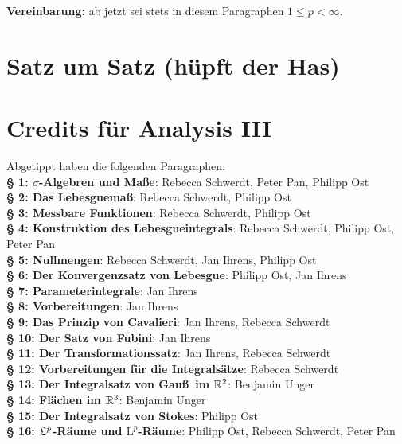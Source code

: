 \documentclass[a4paper,twoside,DIV15,BCOR12mm,chapterprefix=true,headings=onelinechapter]{scrbook}
\begin{document}
\textbf{Vereinbarung:} ab jetzt sei stets in diesem Paragraphen $1 \leq p < \infty$.


\appendix
\chapter{Satz um Satz (hüpft der Has)}

\renewcommand{\indexname}{Stichwortverzeichnis}
\printindex

\chapter{Credits für Analysis III} Abgetippt haben die folgenden Paragraphen:\\%
\textbf{§ 1: $\sigma$-Algebren und Maße}: Rebecca Schwerdt, Peter Pan, Philipp Ost\\
\textbf{§ 2: Das Lebesguemaß}: Rebecca Schwerdt, Philipp Ost\\
\textbf{§ 3: Messbare Funktionen}: Rebecca Schwerdt, Philipp Ost\\
\textbf{§ 4: Konstruktion des Lebesgueintegrals}: Rebecca Schwerdt, Philipp Ost, Peter Pan\\
\textbf{§ 5: Nullmengen}: Rebecca Schwerdt, Jan Ihrens, Philipp Ost\\
\textbf{§ 6: Der Konvergenzsatz von Lebesgue}: Philipp Ost, Jan Ihrens \\
\textbf{§ 7: Parameterintegrale}: Jan Ihrens \\
\textbf{§ 8: Vorbereitungen}: Jan Ihrens \\
\textbf{§ 9: Das Prinzip von Cavalieri}: Jan Ihrens, Rebecca Schwerdt\\
\textbf{§ 10: Der Satz von Fubini}: Jan Ihrens\\
\textbf{§ 11: Der Transformationssatz}: Jan Ihrens, Rebecca Schwerdt\\
\textbf{§ 12: Vorbereitungen für die Integralsätze}: Rebecca Schwerdt\\
\textbf{§ 13: Der Integralsatz von Gau\ss \ im \(\mathbb{R}^{2}\)}: Benjamin Unger\\ 
\textbf{§ 14: Flächen im \(\mathbb{R}^{3}\)}: Benjamin Unger\\
\textbf{§ 15: Der Integralsatz von Stokes}: Philipp Ost\\
\textbf{§ 16: \(\mathfrak{L}^{p}\)-Räume und \(\mathrm{L}^{p}\)-Räume}: Philipp Ost, Rebecca Schwerdt, Peter Pan \\
\end{document}
